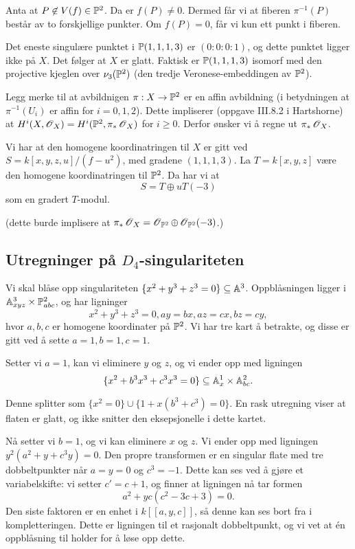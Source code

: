 \documentclass[11pt, norsk]{article}
\begin{document}
Anta at $P \not \in V(f) \in \mathbb{P}^2$. Da er $f(P) \neq 0$. Dermed får vi at fiberen $\pi^{-1}(P)$ består av to forskjellige punkter. Om $f(P)=0$, får vi kun ett punkt i fiberen.

Det eneste singulære punktet i $\mathbb{P}(1,1,1,3)$ er $(0:0:0:1)$, og dette punktet ligger ikke på $X$. Det følger at $X$ er glatt. Faktisk er $\mathbb{P}(1,1,1,3)$ isomorf med den projective kjeglen over $\nu_3(\mathbb{P}^2)$ (den tredje Veronese-embeddingen av $\mathbb{P}^2$).

Legg merke til at avbildnigen $\pi:X \to \mathbb{P}^2$ er en affin avbildning (i betydningen at $\pi^{-1}(U_i)$ er affin for $i=0,1,2$). Dette impliserer (oppgave III.8.2 i Hartshorne) at $H^i(X,\operatorname{\mathscr{O}}_X) = H^i(\mathbb{P}^2,\pi_\ast \operatorname{\mathscr{O}}_X)$ for $i \geq 0$. Derfor ønsker vi å regne ut $\pi_\ast \operatorname{\mathscr{O}}_X$.

Vi har at den homogene koordinatringen til $X$ er gitt ved $S = k[x,y,z,u]/(f-u^2)$, med gradene $(1,1,1,3)$. La $T=k[x,y,z]$ være den homogene koordinatringen til $\mathbb{P}^2$. Da har vi at
$$
S = T \oplus u T (-3)
$$
som en gradert $T$-modul. 

(dette burde implisere at $\pi_\ast \operatorname{\mathscr{O}}_X = \operatorname{\mathscr{O}}_{\mathbb{P}^2} \oplus \operatorname{\mathscr{O}}_{\mathbb{P}^2}(-3)$.)

\subsection{Utregninger på $D_4$-singulariteten}

Vi skal blåse opp singulariteten $\{ x^2+y^3+z^3=0 \} \subseteq \mathbb{A}^3$.  Oppblåsningen ligger i $\mathbb{A}^3_{xyz} \times \mathbb{P}^2_{abc}$, og har ligninger
$$
x^2+y^3+z^3=0, ay=bx, az=cx, bz=cy,
$$
hvor $a,b,c$ er homogene koordinater på $\mathbb{P}^2$. Vi har tre kart å betrakte, og disse er gitt ved å sette $a=1,b=1,c=1$.

Setter vi $a=1$, kan vi eliminere $y$ og $z$, og vi ender opp med ligningen
$$
\{x^2+b^3x^3+c^3x^3=0\} \subseteq \mathbb{A}^1_x \times \mathbb{A}^2_{bc}.
$$

Denne splitter som $\{x^2 =0\} \cup \{ 1+x(b^3+c^3) = 0\}$. En rask utregning viser at flaten er glatt, og ikke snitter den eksepsjonelle i dette kartet.

Nå setter vi $b=1$, og vi kan eliminere $x$ og $z$. Vi ender opp med ligningen $y^2(a^2+y+c^3y)=0$. Den propre transformen er en singular flate med tre dobbeltpunkter når $a=y=0$ og $c^3=-1$. Dette kan ses ved å gjøre et variabelskifte: vi setter $c'=c+1$, og finner at ligningen nå tar formen
$$
a^2+yc(c^2-3c+3)=0.
$$
Den siste faktoren er en enhet i $k[[a,y,c]]$, så denne kan ses bort fra i kompletteringen. Dette er ligningen til et rasjonalt dobbeltpunkt, og vi vet at én oppblåsning til holder for å løse opp dette.
\end{document}
